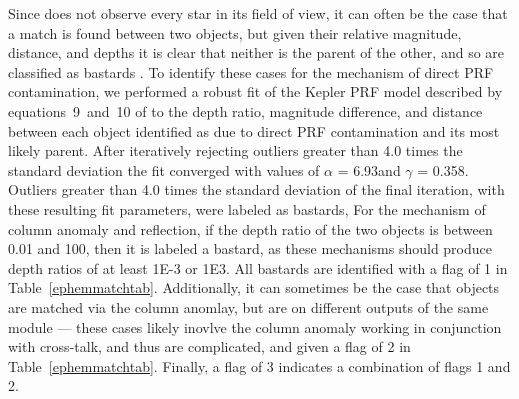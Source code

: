 Since \kepler{} does not observe every star in its field of view, it can often be the case that a match is found between two objects, but given their relative magnitude, distance, and depths it is clear that neither is the parent of the other, and so are classified as bastards \citep{Coughlin2014a}. To identify these cases for the mechanism of direct PRF contamination, we performed a robust fit of the Kepler PRF model described by equations~9~and~10 of \citet{Coughlin2014a} to the depth ratio, magnitude difference, and distance between each object identified as due to direct PRF contamination and its most likely parent. After iteratively rejecting outliers greater than 4.0 times the standard deviation the fit converged with values of $\alpha$ = 6.93\arcsec and $\gamma$ = 0.358\arcsec. Outliers greater than 4.0 times the standard deviation of the final iteration, with these resulting fit parameters, were labeled as bastards, For the mechanism of column anomaly and reflection, if the depth ratio of the two objects is between 0.01 and 100, then it is labeled a bastard, as these mechanisms should produce depth ratios of at least 1E-3 or 1E3. All bastards are identified with a flag of 1 in Table~\ref{ephemmatchtab}. Additionally, it can sometimes be the case that objects are matched via the column anomlay, but are on different outputs of the same module --- these cases likely inovlve the column anomaly working in conjunction with cross-talk, and thus are complicated, and given a flag of 2 in Table~\ref{ephemmatchtab}. Finally, a flag of 3 indicates a combination of flags 1 and 2. 



